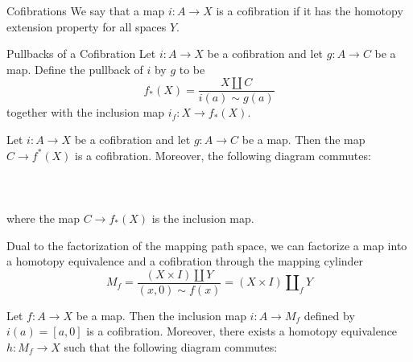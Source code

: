 \documentclass[a4paper]{article}
\begin{document}
\begin{defn}{Cofibrations}{} We say that a map $i:A\to X$ is a cofibration if it has the homotopy extension property for all spaces $Y$. 
\end{defn}

\begin{defn}{Pullbacks of a Cofibration}{} Let $i:A\to X$ be a cofibration and let $g:A\to C$ be a map. Define the pullback of $i$ by $g$ to be $$f_\ast(X)=\frac{X\amalg C}{i(a)\sim g(a)}$$ together with the inclusion map $i_f:X\to f_\ast(X)$. 
\end{defn}

\begin{prp}{}{} Let $i:A\to X$ be a cofibration and let $g:A\to C$ be a map. Then the map $C\to f^\ast(X)$ is a cofibration. Moreover, the following diagram commutes: \\~\\
\\~\\
where the map $C\to f_\ast(X)$ is the inclusion map. 
\end{prp}

Dual to the factorization of the mapping path space, we can factorize a map into a homotopy equivalence and a cofibration through the mapping cylinder $$M_f=\frac{(X\times I)\amalg Y}{(x,0)\sim f(x)}=(X\times I)\amalg_fY$$

\begin{thm}{}{} Let $f:A\to X$ be a map. Then the inclusion map $i:A\to M_f$ defined by $i(a)=[a,0]$ is a cofibration. Moreover, there exists a homotopy equivalence $h:M_f\to X$ such that the following diagram commutes: \\~\\
\end{thm}
\end{document}

